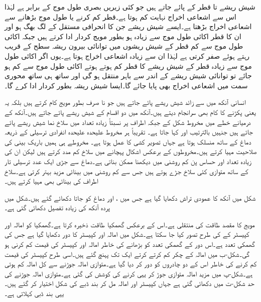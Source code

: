 شیش ریشے   تا  قطر کے پائے جاتے ہیں جو کئی زیریں بصری طول موج کے برابر ہے لہٰذا اس سے اشعاعی اخراج نہایت کم ہوتا ہے۔قطر کم کرنے یا طول موج بڑھانے سے اشعاعی اخراج بڑھتا ہے۔ایسے شیش ریشے جن کا انحرافی مستقل  کے لگ بھگ ہو اور ان کا قطر اکائی طول موج سے زیادہ ہو بطور مویج کردار ادا کرتے ہیں جبکہ اکائی طول موج سے کم قطر  کے شیش ریشوں میں توانائی بیرون ریشہ سطح کے قریب رہتے ہوئے صفر کرتی ہے لہٰذا ان سے زیادہ اشعاعی اخراج ہوتا ہے۔یوں اگر اکائی طول موج  سے زیادہ قطر کے شیش ریشے کا قطر کم ہوتے ہوتے اکائی طول موج سے کم ہو جائے تو توانائی شیش ریشے کے اندر سے  باہر  منتقل ہو گی  اور ساتھ ہی ساتھ محوری سمت میں اشعاعی اخراج بھی پایا جائے گا۔ایسا شیش ریشہ بطور   کردار ادا کرے  گا۔

انسانی آنکھ میں  سے زائد شیش ریشے پائے جاتے ہیں جو نا صرف بطور مویج کام کرتے ہیں بلکہ یہ  یعنی  پکڑنے کا کام بھی سرانجام دیتے ہیں۔آنکھ میں دو اقسام کے شیش ریشے پائے جاتے ہیں۔آنکھ کے درمیانے خطے میں مخروط شکل کے  جبکہ اطراف پر نسبتاً زیادہ تعداد میں سلاخ نما شیش ریشے پائے جاتے ہیں جنہیں بالترتیب  اور   کہا جاتا ہے۔ تقریباً ہر مخروط علیحدہ علیحدہ انفرادی ترسیلی  کے ذریعہ دماغ کے ساتھ منسلک ہوتا ہے جہاں تصویر کشی کا عمل ہوتا ہے۔ مخروطے ہی ہمیں باریک بینی کی صلاحیت مہیا کرتے ہیں۔مخروطوں کے برعکس اشکال پہچانے میں سلاخ کم مدد کرتے ہیں لیکن ان کی زیادہ تعداد اور حساس پن  کم روشنی میں دیکھنا ممکن بناتی ہے۔دماغ سے جڑی ایک عدد ترسیلی تار کے ساتھ متوازی کئی سلاخ جڑے ہوتے ہیں جس سے کم روشنی میں بینائی مزید بہتر کرتی ہے۔سلاخ اطراف کی بینائی بھی مہیا کرتے ہیں۔  

شکل میں آنکھ کا عمودی تراش دکھایا گیا ہے جس میں ،  اور دماغ کو جاتا  دکھائے گئے ہیں۔شکل میں پردہ آنکھ کی زیادہ تفصیل دکھائی گئی ہے۔

مویج کا مقصد طاقت کی منتقلی ہے۔اس کے برعکس گھمکیا طاقت ذخیرہ کرتا ہے۔گھمکیا کو امالہ اور کپیسٹر کے  کی طرح تصور کیا جا سکتا ہے۔شکل میں امالہ اور کپیسٹر کا دور  دکھایا گیا ہے  جس کی گھمکی تعدد  ہے۔اس دور کے گھمکی تعدد کو بڑھانے کی خاطر امالہ اور کپیسٹر کی قیمت کم کرنی ہو گی۔شکل-ب میں امالہ کے چکر کم کرتے کرتے ایک تک پہنچ گئے ہیں۔اسی طرح کپیسٹر کی قیمت کم کرنے کی خاطر اس کے دو چادروں کو دور کر دیا گیا ہے۔متوازی امالہ جوڑنے سے کل امالہ کم ہوتی ہے۔شکل-پ میں مزید امالہ متوازی جوڑ کر یہی کرنے کی کوشش کی گئی ہے۔متوازی امالہ جوڑنے کی حد شکل-ت میں دکھائی گئی ہے جہاں کپیسٹر اور امالہ مل کر بند ڈبے کی شکل اختیار کر گئے ہیں۔یہی بند ڈبی   کہلاتی ہے۔ 

